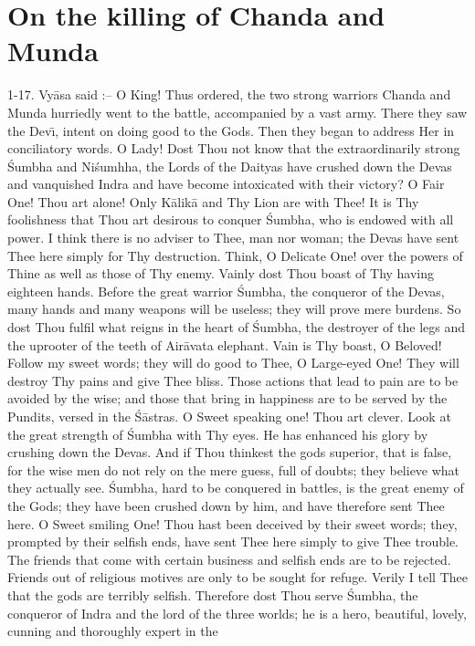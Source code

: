 \chapter{On the killing of Chanda and Munda}

1-17. Vy\=asa said :-- O King! Thus ordered, the two strong warriors Chanda and Munda hurriedly went to the battle, accompanied by a vast army. There they saw the Dev\={\i}, intent on doing good to the Gods. Then they began to address Her in conciliatory words. O Lady! Dost Thou not know that the extraordinarily strong \'Sumbha and Ni\'sumhha, the Lords of the Daityas have crushed down the Devas and vanquished Indra and have become intoxicated with their victory? O Fair One! Thou art alone! Only K\=alik\=a and Thy Lion are with Thee! It is Thy foolishness that Thou art desirous to conquer \'Sumbha, who is endowed with all power. I think there is no adviser to Thee, man nor woman; the Devas have sent Thee here simply for Thy destruction. Think, O Delicate One! over the powers of Thine as well as those of Thy enemy. Vainly dost Thou boast of Thy having eighteen hands. Before the great warrior \'Sumbha, the conqueror of the Devas, many hands and many weapons will be useless; they will prove mere burdens. So dost Thou fulfil what reigns in the heart of \'Sumbha, the destroyer of the legs and the uprooter of the teeth of Air\=avata elephant. Vain is Thy boast, O Beloved! Follow my sweet words; they will do good to Thee, O Large-eyed One! They will destroy Thy pains and give Thee bliss. Those actions that lead to pain are to be avoided by the wise; and those that bring in happiness are to be served by the Pundits, versed in the \'S\=astras. O Sweet speaking one! Thou art clever. Look at the great strength of \'Sumbha with Thy eyes. He has enhanced his glory by crushing down the Devas. And if Thou thinkest the gods superior, that is false, for the wise men do not rely on the mere guess, full of doubts; they believe what they actually see. \'Sumbha, hard to be conquered in battles, is the great enemy of the Gods; they have been crushed down by him, and have therefore sent Thee here. O Sweet smiling One! Thou hast been deceived by their sweet words; they, prompted by their selfish ends, have sent Thee here simply to give Thee trouble. The friends that come with certain business and selfish ends are to be rejected. Friends out of religious motives are only to be sought for refuge. Verily I tell Thee that the gods are terribly selfish. Therefore dost Thou serve \'Sumbha, the conqueror of Indra and the lord of the three worlds; he is a hero, beautiful, lovely, cunning and thoroughly expert in the

